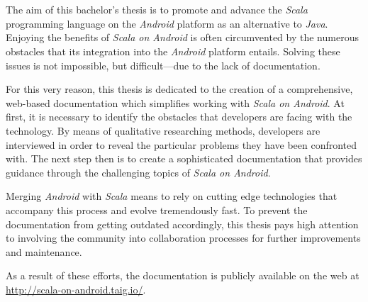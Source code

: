 \section*{}

The aim of this bachelor's thesis is to promote and advance the \textit{Scala} programming language on the \textit{Android} platform as an alternative to \textit{Java}. Enjoying the benefits of \textit{Scala on Android} is often circumvented by the numerous obstacles that its integration into the \textit{Android} platform entails. Solving these issues is not impossible, but difficult---due to the lack of documentation.

For this very reason, this thesis is dedicated to the creation of a comprehensive, web-based documentation which simplifies working with \textit{Scala on Android}. At first, it is necessary to identify the obstacles that developers are facing with the technology. By means of qualitative researching methods, developers are interviewed in order to reveal the particular problems they have been confronted with. The next step then is to create a sophisticated documentation that provides guidance through the challenging topics of \textit{Scala on Android}.

Merging \textit{Android} with \textit{Scala} means to rely on cutting edge technologies that accompany this process and evolve tremendously fast. To prevent the documentation from getting outdated accordingly, this thesis pays high attention to involving the community into collaboration processes for further improvements and maintenance.

As a result of these efforts, the documentation is publicly available on the web at \url{http://scala-on-android.taig.io/}.